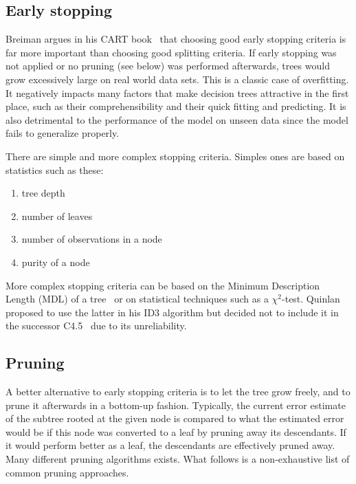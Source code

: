 
\subsection{Early stopping}
Breiman argues in his CART book~\cite{cart} that choosing good early stopping criteria is far more important than choosing good splitting criteria. If early stopping was not applied or no pruning (see below) was performed afterwards, trees would grow excessively large on real world data sets. This is a classic case of overfitting. It negatively impacts many factors that make decision trees attractive in the first place, such as their comprehensibility and their quick fitting and predicting. It is also detrimental to the performance of the model on unseen data since the model fails to generalize properly.

There are simple and more complex stopping criteria. Simples ones are based on statistics such as these:
\begin{enumerate}
    \item tree depth
    \item number of leaves
    \item number of observations in a node
    \item purity of a node
\end{enumerate}

More complex stopping criteria can be based on the Minimum Description Length (MDL) of a tree~\cite{mdlstopping} or on statistical techniques such as a $\chi^2$-test. Quinlan proposed to use the latter in his ID3 algorithm but decided not to include it in the successor C4.5~\cite{id3ter, c45} due to its unreliability.

\subsection{Pruning}
A better alternative to early stopping criteria is to let the tree grow freely, and to prune it afterwards in a bottom-up fashion. Typically, the current error estimate of the subtree rooted at the given node is compared to what the estimated error would be if this node was converted to a leaf by pruning away its descendants. If it would perform better as a leaf, the descendants are effectively pruned away. Many different pruning algorithms exists. What follows is a non-exhaustive list of common pruning approaches.

